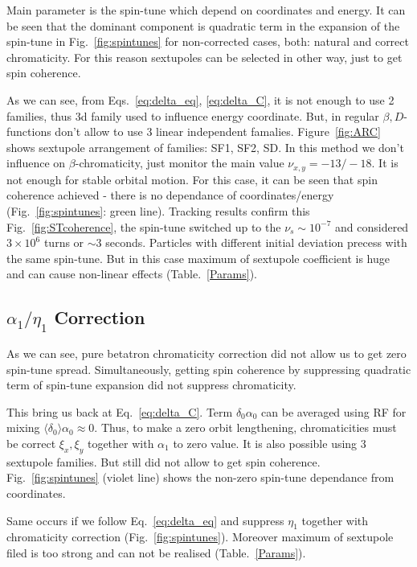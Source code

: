 \documentclass[a4paper]{jpconf}
\begin{document}
Main parameter is the spin-tune which depend on coordinates and energy. It can be seen that the dominant component is quadratic term in the expansion of the spin-tune in Fig.~\ref{fig:spintunes} for non-corrected cases, both: natural and correct chromaticity. For this reason sextupoles can be selected in other way, just to get spin coherence.

\par As we can see, from Eqs.~\ref{eq:delta_eq}, \ref{eq:delta_C}, it is not enough to use 2 families, thus 3d family used to influence energy coordinate. But, in regular $\beta, D$-functions don't allow to use 3 linear independent famalies. Figure~\ref{fig:ARC} shows sextupole arrangement of families: SF1, SF2, SD. In this method we don't influence on $\beta$-chromaticity, just monitor the main value $\nu_{x,y} = -13/-18$. It is not enough for stable orbital motion. For this case, it can be seen that spin coherence achieved - there is no dependance of coordinates/energy (Fig.~\ref{fig:spintunes}: green line). Tracking results confirm this Fig.~\ref{fig:STcoherence}, the spin-tune switched up to the $\nu_{s} \sim 10^{-7}$ and considered $3\times10^{6}$ turns or $\sim3$ seconds. Particles with different initial deviation precess with the same spin-tune. But in this case maximum of sextupole coefficient is huge and can cause non-linear effects (Table.~\ref{Params}).

\subsection{$\alpha_{1}/\eta_{1}$ Correction}

\par As we can see, pure betatron chromaticity correction did not allow us to get zero spin-tune spread. Simultaneously, getting spin coherence by suppressing quadratic term of spin-tune expansion did not suppress chromaticity.
\par This bring us back at Eq.~\ref{eq:delta_C}. Term $\delta_{0} \alpha_{0}$ can be averaged using RF for mixing $\langle\delta_{0}\rangle \alpha_{0} \approx 0$. Thus, to make a zero orbit lengthening, chromaticities must be correct $\xi_x, \xi_{y}$ together with $\alpha_{1}$ to zero value. It is also possible using 3 sextupole families. But still did not allow to get spin coherence. Fig.~\ref{fig:spintunes} (violet line) shows the non-zero spin-tune dependance from coordinates.
\par Same occurs if we follow Eq.~\ref{eq:delta_eq} and suppress $\eta_{1}$ together with chromaticity correction (Fig.~\ref{fig:spintunes}). Moreover maximum of sextupole filed is too strong and can not be realised (Table.~\ref{Params}).
\end{document}
